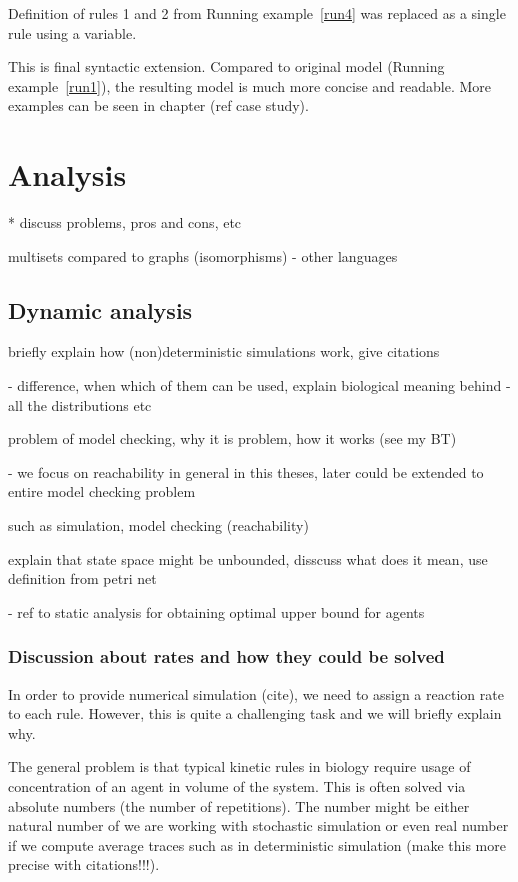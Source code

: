 \documentclass[12pt]{fithesis2}
\begin{document}
\noindent Definition of rules 1 and 2 from Running example~\ref{run4} was replaced as a single rule using a variable.

This is final syntactic extension. Compared to original model (Running example~\ref{run1}), the resulting model is much more concise and readable. More examples can be seen in chapter (ref case study).

\chapter{Analysis}

* discuss problems, pros and cons, etc

multisets compared to graphs (isomorphisms) - other languages

\section{Dynamic analysis}

briefly explain how (non)deterministic simulations work, give citations

 - difference, when which of them can be used, explain biological meaning behind
 - all the distributions etc

problem of model checking, why it is problem, how it works (see my BT) 

 - we focus on reachability in general in this theses, later could be extended to entire model checking problem

such as simulation, model checking (reachability)

explain that state space might be unbounded, disscuss what does it mean, use definition from petri net

 - ref to static analysis for obtaining optimal upper bound for agents

\subsection{Discussion about rates and how they could be solved}

In order to provide numerical simulation (cite), we need to assign a reaction rate to each rule. However, this is quite a challenging task and we will briefly explain why.

The general problem is that typical kinetic rules in biology require usage of concentration of an agent in volume of the system. This is often solved via absolute numbers (the number of repetitions). The number might be either natural number of we are working with stochastic simulation or even real number if we compute average traces such as in deterministic simulation (make this more precise with citations!!!).
\end{document}
